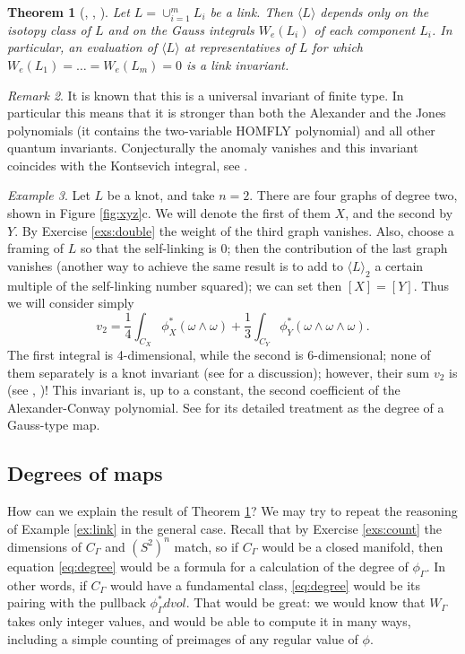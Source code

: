 \documentclass[10pt]{amsart}
\newtheorem{thm}{Theorem}[section]
\theoremstyle{definition}
\theoremstyle{remark}
\newtheorem{rem}[thm]{Remark}
\newtheorem{ex}[thm]{Example}
\def\<{\langle}
\def\>{\rangle}
\newcommand{\dvol}{dvol}
\newcommand{\GG}{\Gamma}
\newcommand{\Go}{\omega}
\begin{document}
\begin{thm}[\cite{AF}, \cite{Poi}, \cite{T}]\label{thm:L}
Let $L=\cup_{i=1}^m L_i$ be a link. Then $\<L\>$ depends only on
the isotopy class of $L$ and on the Gauss integrals $W_e(L_i)$
of each component $L_i$. In particular, an evaluation of $\<L\>$
at representatives of $L$ for which $W_e(L_1)=\dots=W_e(L_m)=0$
is a link invariant.
\end{thm}

\begin{rem}
It is known that this is a universal invariant of finite type.
In particular this means that it is stronger than both the Alexander
and the Jones polynomials (it contains the two-variable HOMFLY
polynomial) and all other quantum invariants. Conjecturally the
anomaly vanishes and this invariant coincides with the Kontsevich
integral, see \cite{Poi}.
\end{rem}

\begin{ex}\label{ex:v2}
Let $L$ be a knot, and take $n=2$. There are four graphs of degree
two, shown in Figure \ref{fig:xyz}c. We will denote the first of
them $X$, and the second by $Y$. By Exercise \ref{exs:double} the
weight of the third graph vanishes. Also, choose a framing of $L$
so that the self-linking is 0; then the contribution of the last
graph vanishes (another way to achieve the same result is to add
to $\<L\>_2$ a certain multiple of the self-linking number
squared); we can set then $[X]=[Y]$. Thus we will consider simply
$$
    v_2=\frac14\int_{C_X} \phi^*_X (\Go\wedge\Go)+\frac13\int_{C_Y}\phi^*_Y
(\Go\wedge\Go\wedge\Go).
$$
The first integral is 4-dimensional,
while the second is 6-dimensional; none of them separately is a
knot invariant (see \cite{PV} for a discussion); however, their
sum $v_2$ is (see \cite{BN}, \cite{PV})! This invariant is, up
to a constant, the second coefficient of the Alexander-Conway
polynomial. See \cite{PV} for its detailed treatment as the
degree of a Gauss-type map.
\end{ex}

\subsection{Degrees of maps}
How can we explain the result of Theorem \ref{thm:L}? We may try
to repeat the reasoning of Example \ref{ex:link} in the general
case. Recall that by Exercise \ref{exs:count} the dimensions of
$C_\GG$ and $(S^2)^n$ match, so if $C_\GG$ would be a closed
manifold, then equation \eqref{eq:degree} would be a formula for a
calculation of the degree of $\phi_\GG$. In other words, if
$C_\GG$ would have a fundamental class, \eqref{eq:degree} would be
its pairing with the pullback $\phi_\GG^*\dvol$. That would be
great: we would know that $W_\GG$ takes only integer values, and
would be able to compute it in many ways, including a simple
counting of preimages of any regular value of $\phi$.
\end{document}
